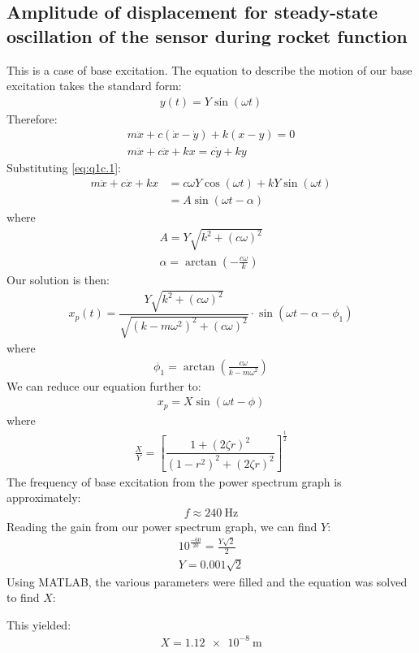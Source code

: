 \documentclass[11pt]{article}
\numberwithin{equation}{section}
\begin{document}
\subsection{Amplitude of displacement for steady-state oscillation of the sensor during rocket function}
This is a case of base excitation. The equation to describe the motion of our base excitation takes the standard form:
\begin{gather}
    y(t) = Y\sin\left(\omega t\right)\label{eq:q1c.1}
\end{gather}
Therefore:
\begin{gather}
    m \ddot{x} + c\left(\dot{x} - \dot{y}\right) + k\left(x-y\right)=0\\
    m\ddot{x} + c\ddot{x} + kx = c\dot{y} + ky
\end{gather}
Substituting \ref{eq:q1c.1}:
\begin{align}
    m\ddot{x} + c\dot{x} + kx & = c\omega Y \cos \left(\omega t\right) + kY\sin \left(\omega t\right) \\
                              & = A \sin \left(\omega t - \alpha \right)
\end{align}
where
\begin{gather}
    A = Y \sqrt{k^2 + \left(c \omega\right)^2}\\
    \alpha = \arctan \left(-\frac{c\omega}{k}\right)
\end{gather}
Our solution is then:
\begin{gather}
    x_p (t) = \dfrac{Y\sqrt{k^2 + \left(c\omega\right)^2}}{\sqrt{\left(k - m\omega^2\right)^2 + \left(c \omega\right)^2}}\cdot \sin\left(\omega t - \alpha - \phi_1\right)
\end{gather}
where
\begin{gather}
    \phi_1 = \arctan\left(\frac{c\omega}{k - m\omega^2 }\right)
\end{gather}
We can reduce our equation further to:
\begin{gather}
    x_p = X \sin \left(\omega t - \phi\right)
\end{gather}
where
\begin{gather}
    \frac{X}{Y} = \left[\dfrac{1+\left(2\zeta r\right)^2}{\left(1-r^2\right)^2 + \left(2\zeta r\right)^2}\right]^{\frac{1}{2}}
\end{gather}
The frequency of base excitation from the power spectrum graph is approximately:
\begin{gather}
    f \approx \SI{240}{\hertz}
\end{gather}
Reading the gain from our power spectrum graph, we can find $Y$:
\begin{gather}
    10^{\frac{-60}{20}} = \frac{Y\sqrt{2}}{2}\\
    Y = 0.001\sqrt{2}
\end{gather}
Using MATLAB, the various parameters were filled and the equation was solved to find $X$:

This yielded:
\begin{gather}
    X = \SI{1.12e-8}{\meter}
\end{gather}
\end{document}
